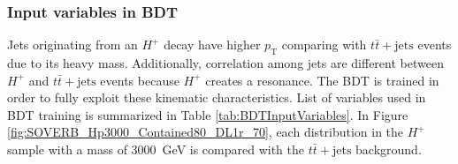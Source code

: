 \subsubsection{Input variables in BDT}
\label{subsubsec:BDTInputVars}
Jets originating from an $H^{+}$ decay have higher $p_\text{T}$ comparing with $t\bar{t}+\text{jets}$ events due to its heavy mass. Additionally, correlation among jets are different between $H^{+}$ and $t\bar{t}+\text{jets}$ events because $H^+$ creates a resonance. The BDT is trained in order to fully exploit these kinematic characteristics. List of variables used in BDT training is summarized in Table \ref{tab:BDTInputVariables}. In Figure \ref{fig:SOVERB_Hp3000_Contained80_DL1r_70}, each distribution in the $H^{+}$ sample with a mass of 3000~GeV is compared with the $t\bar{t}+\text{jets}$ background. 

